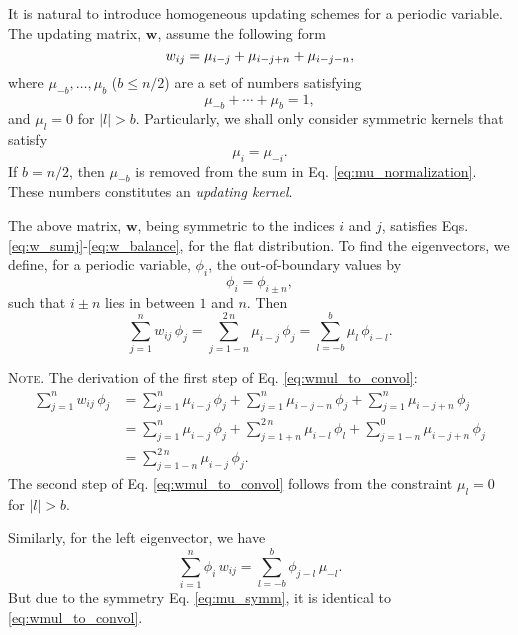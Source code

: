 \documentclass[reprint, floatfix]{revtex4-1}
\newcommand{\note}[1]{{\color{DarkGreen}\footnotesize \textsc{Note.} #1}}
\begin{document}
It is natural to introduce homogeneous updating schemes
for a periodic variable\cite{dama2014}.
%
The updating matrix, $\mathbf w$,
assume the following form
%
\begin{equation}
  w_{ij}
  =
  \mu_{i-j}
  +
  \mu_{i-j+n}
  +
  \mu_{i-j-n}
  ,
\notag
\end{equation}
%
where
$\mu_{-b}, \dots, \mu_b$ ($b \le n/2$)
are a set of numbers satisfying
%
\begin{equation}
  \mu_{-b} + \cdots + \mu_b = 1
  ,
\label{eq:mu_normalization}
\end{equation}
%
and $\mu_l = 0$ for $|l| > b$.
%
Particularly,
we shall only consider symmetric kernels
that satisfy
%
\begin{equation}
  \mu_i = \mu_{-i}
  .
\label{eq:mu_symm}
\end{equation}
%
If $b = n/2$, then $\mu_{-b}$ is removed
from the sum in Eq. \eqref{eq:mu_normalization}.
%
These numbers constitutes an \emph{updating kernel}.


The above matrix, $\mathbf w$,
being symmetric to the indices $i$ and $j$,
satisfies Eqs. \eqref{eq:w_sumj}-\eqref{eq:w_balance},
for the flat distribution.
%
To find the eigenvectors,
we define, for a periodic variable, $\phi_i$,
the out-of-boundary values by
%
\begin{equation}
  \phi_i = \phi_{i \pm n},
\label{eq:phi_pbc}
\end{equation}
%
such that $i \pm n$ lies in between $1$ and $n$.
%
Then
%
\begin{equation}
  \sum_{ j = 1 }^n
    w_{ij} \, \phi_j
  =
  \sum_{ j = 1 - n }^{ 2 \, n }
    \mu_{i - j} \, \phi_j
  =
  \sum_{ l = -b }^{ b }
    \mu_l \, \phi_{ i - l}
  .
\label{eq:wmul_to_convol}
\end{equation}
%
\note{The derivation of the first step of
  Eq. \eqref{eq:wmul_to_convol}:
$$
\begin{aligned}
  \sum_{j = 1}^n
    w_{ij} \, \phi_j
  &=
  \sum_{j = 1}^n
    \mu_{i - j} \, \phi_j
  +
  \sum_{j = 1}^n
    \mu_{i - j - n} \, \phi_j
  +
  \sum_{j = 1}^n
    \mu_{i - j + n} \, \phi_j
  \\
  &=
  \sum_{j = 1}^n
    \mu_{i - j} \, \phi_j
  +
  \sum_{j = 1+n}^{2 \, n}
    \mu_{i - l} \, \phi_l
  +
  \sum_{j = 1-n}^0
    \mu_{i - j + n} \, \phi_j
  \\
  &=
  \sum_{j = 1-n}^{2 \, n}
    \mu_{i - j} \, \phi_j
  .
\end{aligned}
$$
The second step of Eq. \eqref{eq:wmul_to_convol}
follows from the constraint $\mu_l = 0$ for $|l| > b$.

Similarly,
for the left eigenvector, we have
$$
  \sum_{ i = 1 }^n
    \phi_i \, w_{ij}
  =
  \sum_{ l = -b }^b
    \phi_{j - l} \, \mu_{-l}
  .
$$
But due to the symmetry Eq. \eqref{eq:mu_symm},
it is identical to \eqref{eq:wmul_to_convol}.
}
\end{document}
